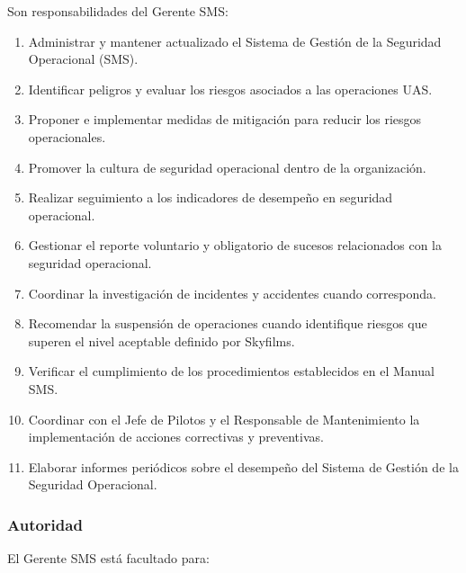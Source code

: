 Son responsabilidades del Gerente SMS:

\begin{enumerate}[label=\alph*)]

\item Administrar y mantener actualizado el Sistema de Gestión de la Seguridad Operacional (SMS).

\item Identificar peligros y evaluar los riesgos asociados a las operaciones UAS.

\item Proponer e implementar medidas de mitigación para reducir los riesgos operacionales.

\item Promover la cultura de seguridad operacional dentro de la organización.

\item Realizar seguimiento a los indicadores de desempeño en seguridad operacional.

\item Gestionar el reporte voluntario y obligatorio de sucesos relacionados con la seguridad operacional.

\item Coordinar la investigación de incidentes y accidentes cuando corresponda.

\item Recomendar la suspensión de operaciones cuando identifique riesgos que superen el nivel aceptable definido por Skyfilms.

\item Verificar el cumplimiento de los procedimientos establecidos en el Manual SMS.

\item Coordinar con el Jefe de Pilotos y el Responsable de Mantenimiento la implementación de acciones correctivas y preventivas.

\item Elaborar informes periódicos sobre el desempeño del Sistema de Gestión de la Seguridad Operacional.

\end{enumerate}

\subsubsection*{Autoridad}

El Gerente SMS está facultado para:

